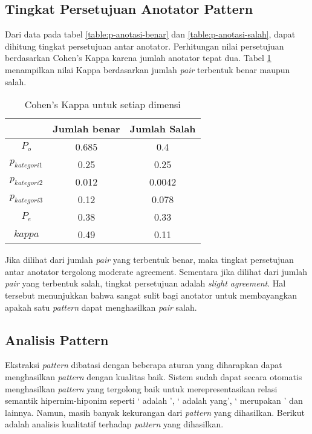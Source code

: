 \subsection{Tingkat Persetujuan Anotator Pattern}
Dari data pada tabel \ref{table:p-anotasi-benar} dan \ref{table:p-anotasi-salah}, dapat dihitung tingkat persetujuan antar anotator. Perhitungan nilai persetujuan berdasarkan Cohen's Kappa karena jumlah anotator tepat dua. Tabel \ref{table:p-kappa} menampilkan nilai Kappa berdasarkan jumlah \textit{pair} terbentuk benar maupun salah.

\begin{table}
  \centering
  \caption{Cohen's Kappa untuk setiap dimensi}
  \label{table:p-kappa}
  \begin{tabular}{|c|c|c|}
  \hline
  & Jumlah benar & Jumlah Salah \\ \hline
  $P_o$ & 0.685 & 0.4 \\ \hline
  $p_{kategori1}$ & 0.25 & 0.25 \\ \hline
  $p_{kategori2}$ & 0.012 & 0.0042 \\ \hline
  $p_{kategori3}$ & 0.12 & 0.078 \\ \hline
  $P_e$ & 0.38 & 0.33 \\ \hline
  $kappa$ & 0.49 & 0.11 \\ \hline 
  \end{tabular} 
\end{table}

Jika dilihat dari jumlah \textit{pair} yang terbentuk benar, maka tingkat persetujuan antar anotator tergolong {moderate agreement}. Sementara jika dilihat dari jumlah \textit{pair} yang terbentuk salah, tingkat persetujuan adalah \textit{slight agreement}. Hal tersebut menunjukkan bahwa sangat sulit bagi anotator untuk membayangkan apakah satu \textit{pattern} dapat menghasilkan \textit{pair} salah.

\subsection{Analisis Pattern}
Ekstraksi \textit{pattern} dibatasi dengan beberapa aturan yang diharapkan dapat menghasilkan \textit{pattern} dengan kualitas baik. Sistem sudah dapat secara otomatis menghasilkan \textit{pattern} yang tergolong baik untuk merepresentasikan relasi semantik hipernim-hiponim seperti `{\tagHyponym} adalah {\tagHypernym}', `{\tagHyponym} adalah {\tagHypernym} yang', `{\tagHyponym} merupakan {\tagHypernym}' dan lainnya. Namun, masih banyak kekurangan dari \textit{pattern} yang dihasilkan. Berikut adalah  analisis kualitatif terhadap \textit{pattern} yang dihasilkan.

